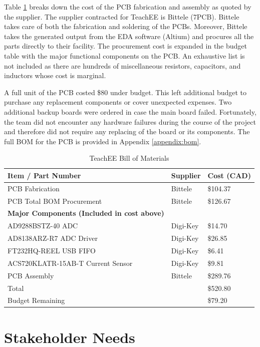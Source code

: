 \documentclass[letterpaper,11pt]{article}
\begin{document}
Table \ref{tab:abbreviated-bom} breaks down the cost of the PCB
fabrication and assembly as quoted by the supplier. The supplier contracted for
TeachEE is Bittele (7PCB). Bittele takes care of both the fabrication and
soldering of the PCBs. Moreover, Bittele takes the generated output from the EDA
software (Altium) and procures all the parts directly to their facility. The
procurement cost is expanded in the budget table with the major functional
components on the PCB. An exhaustive list is not included as there are hundreds
of miscellaneous resistors, capacitors, and inductors whose cost is marginal.

A full unit of the PCB costed \$80 under budget. This left
additional budget to purchase any replacement components or
cover unexpected expenses. Two additional backup boards were ordered in case the main
board failed. Fortunately, the team did not encounter any hardware failures during the
course of the project and therefore did not require any replacing of the board or its
components. The full BOM for the PCB is provided in Appendix \ref{appendix:bom}.

\begin{table}[H]
    \caption{TeachEE Bill of Materials}
    \begin{tabularx}{\textwidth}{l|l|l}
        \textbf{Item / Part Number} & \textbf{Supplier} & \textbf{Cost (CAD)} \\
        \hline
        PCB Fabrication & Bittele & \$104.37\\
        PCB Total BOM Procurement & Bittele & \$126.67\\
        \hline
        \textbf{Major Components (Included in cost above)}& &\\
        \hline
        AD9288BSTZ-40 ADC & Digi-Key & \$14.70\\
        AD8138ARZ-R7 ADC Driver & Digi-Key & \$26.85\\
        FT232HQ-REEL USB FIFO & Digi-Key & \$6.41\\
        ACS720KLATR-15AB-T Current Sensor & Digi-Key & \$9.81\\
        \hline
        PCB Assembly & Bittele & \$289.76\\
        \hline
        Total & & \$520.80\\
        \hline
        Budget Remaining & & \$79.20
    \end{tabularx} 
\label{tab:abbreviated-bom}
\end{table}

\section{Stakeholder Needs} %
\end{document}
